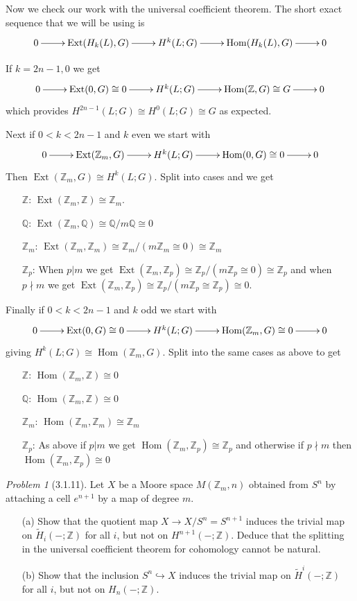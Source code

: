\documentclass[10pt]{article}
\newcommand{\sk}{\vskip 10mm}
\newcommand{\bb}[1]{\mathbb{#1}}
\newcommand{\rH}{\widetilde{H}}
\DeclareMathOperator{\Ext}{Ext}
\DeclareMathOperator{\Hom}{Hom}
\theoremstyle{remark}
\newtheorem{problem}{Problem}
\begin{document}
Now we check our work with the universal coefficient theorem. The
short exact sequence that we will be using is
\[
  \xymatrix{
    0 \ar[r] & \Ext(H_k(L),G) \ar[r] & H^k(L;G) \ar[r] & \Hom(H_k(L),G) \ar[r] & 0
  }
\]

If $k=2n-1,0$ we get
\[
  \xymatrix{
    0 \ar[r] & \Ext(0,G)\cong 0 \ar[r] & H^k(L;G) \ar[r] & \Hom(\bb{Z},G)\cong G \ar[r] & 0
  }
\]
which provides $H^{2n-1}(L;G)\cong H^0(L;G)\cong G$ as expected.

Next if $0<k<2n-1$ and $k$ even we start with
\[
  \xymatrix{
    0 \ar[r] & \Ext(\bb{Z}_m,G)\ar[r] & H^k(L;G) \ar[r] & \Hom(0,G)\cong 0 \ar[r] & 0
  }
\]
Then $\Ext(\bb{Z}_m,G)\cong H^k(L;G)$. Split into cases and we get
\begin{itemize}
\item[$\bb{Z}$:] $\Ext(\bb{Z}_m,\bb{Z})\cong\bb{Z}_m$.
\item[$\bb{Q}$:] $\Ext(\bb{Z}_m,\bb{Q})\cong \bb{Q}/m\bb{Q}\cong 0$
\item[$\bb{Z}_m$:] $\Ext(\bb{Z}_m,\bb{Z}_m)\cong \bb{Z}_m/(m\bb{Z}_m\cong 0)\cong \bb{Z}_m$
\item[$\bb{Z}_p$:] When $p|m$ we get $\Ext(\bb{Z}_m,\bb{Z}_p)\cong \bb{Z}_p/(m\bb{Z}_p\cong 0)\cong \bb{Z}_p$
  and when $p\nmid m$ we get $\Ext(\bb{Z}_m,\bb{Z}_p)\cong \bb{Z}_p/(m\bb{Z}_p\cong \bb{Z}_p)\cong 0$.
\end{itemize}

Finally if $0<k<2n-1$ and $k$ odd we start with
\[
  \xymatrix{
    0 \ar[r] & \Ext(0,G)\cong 0\ar[r] & H^k(L;G) \ar[r] & \Hom(\bb{Z}_m,G)\cong 0 \ar[r] & 0      
  }
\]
giving $H^k(L;G)\cong\Hom(\bb{Z}_m,G)$. Split into the same cases as above to get
\begin{itemize}
\item[$\bb{Z}$:] $\Hom(\bb{Z}_m,\bb{Z})\cong 0$
\item[$\bb{Q}$:] $\Hom(\bb{Z}_m,\bb{Z})\cong 0$
\item[$\bb{Z}_m$:] $\Hom(\bb{Z}_m,\bb{Z}_m)\cong \bb{Z}_m$
\item[$\bb{Z}_p$:] As above if $p|m$ we get $\Hom(\bb{Z}_m,\bb{Z}_p)\cong \bb{Z}_p$
  and otherwise if $p\nmid m$ then $\Hom(\bb{Z}_m,\bb{Z}_p)\cong 0$
\end{itemize}

\sk

\begin{problem}[3.1.11]
  Let $X$ be a Moore space $M(\bb{Z}_m,n)$ obtained from $S^n$ by attaching
  a cell $e^{n+1}$ by a map of degree $m$.
  \begin{itemize}
  \item[(a)] Show that the quotient map $X\rightarrow X/S^n=S^{n+1}$ induces the
    trivial map on $\rH_i(-;\bb{Z})$ for all $i$, but not on
    $H^{n+1}(-;\bb{Z})$. Deduce that the splitting in the universal coefficient
    theorem for cohomology cannot be natural.
  \item[(b)] Show that the inclusion $S^n\hookrightarrow X$ induces the trivial
    map on $\rH^i(-;\bb{Z})$ for all $i$, but not on $H_n(-;\bb{Z})$.
  \end{itemize}
\end{problem}
\end{document}
